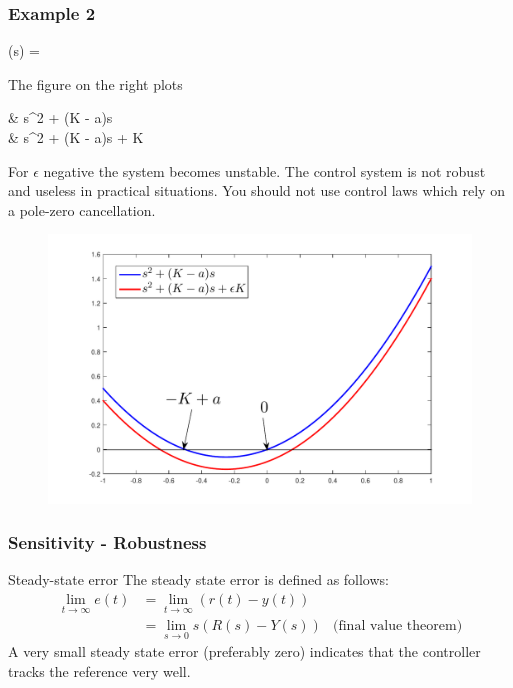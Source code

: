\begin{frame}
	\frametitle{Example 2}
	\begin{minipage}{0.5\linewidth}
		\begin{exampleblock}{}
			\vspace*{-1em}
			\begin{flalign*}
				(s) = 
			\end{flalign*}
			The figure on the right plots
			\begin{flalign*}
				&{\color{blue} s^2 + (K - a)s} \\
				&{\color{red} s^2 + (K - a)s + \epsilon K}
			\end{flalign*}
			For $\epsilon$ negative the system becomes unstable. The control system is not robust and useless in practical situations. You should not use control laws which rely on a pole-zero cancellation. 
		\end{exampleblock}
	\end{minipage}
	\hspace{0.1em}
	\begin{minipage}{0.4\linewidth}
		\begin{figure}
			\center
			\includegraphics[width=1.5\linewidth]{robustnessexample}
			\label{fig:robustness-example}
		\end{figure}
	\end{minipage}
\end{frame}


\begin{frame}
	\frametitle{Sensitivity - Robustness}
	\begin{block}{Steady-state error}
		The steady state error is defined as follows:
		\begin{align*}
			\lim\limits_{t \rightarrow \infty} e(t)
			&= \lim\limits_{t \rightarrow \infty} (r(t) - y(t)) \\
			&= \lim\limits_{s \rightarrow 0} s(R(s) - Y(s)) &\text{(final value theorem)}
		\end{align*}
		A very small steady state error (preferably zero) indicates that the controller tracks the reference very well.
	\end{block}
\end{frame}


